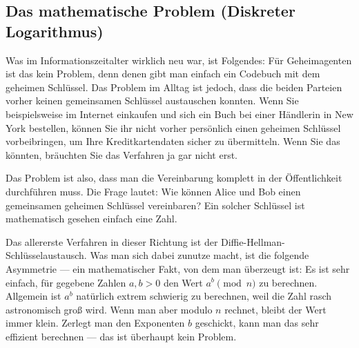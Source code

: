 \begin{math-stroke}
\begin{center}
\end{center}
\end{math-stroke}

\subsection{Das mathematische Problem (Diskreter Logarithmus)}

\begin{spoken-clean}[00:15:10 - 00:18:21]
Was im Informationszeitalter wirklich neu war, ist Folgendes: Für Geheimagenten ist das kein Problem, denn denen gibt man einfach ein Codebuch mit dem geheimen Schlüssel. Das Problem im Alltag ist jedoch, dass die beiden Parteien vorher keinen gemeinsamen Schlüssel austauschen konnten. Wenn Sie beispielsweise im Internet einkaufen und sich ein Buch bei einer Händlerin in New York bestellen, können Sie ihr nicht vorher persönlich einen geheimen Schlüssel vorbeibringen, um Ihre Kreditkartendaten sicher zu übermitteln. Wenn Sie das könnten, bräuchten Sie das Verfahren ja gar nicht erst.

Das Problem ist also, dass man die Vereinbarung komplett in der Öffentlichkeit durchführen muss. Die Frage lautet: Wie können Alice und Bob einen gemeinsamen geheimen Schlüssel vereinbaren? Ein solcher Schlüssel ist mathematisch gesehen einfach eine Zahl.

Das allererste Verfahren in dieser Richtung ist der Diffie-Hellman-\hspace{0pt}Schlüsselaustausch. Was man sich dabei zunutze macht, ist die folgende Asymmetrie --- ein mathematischer Fakt, von dem man überzeugt ist: Es ist sehr einfach, für gegebene Zahlen $a, b > 0$ den Wert $a^b \pmod n$ zu berechnen. Allgemein ist $a^b$ natürlich extrem schwierig zu berechnen, weil die Zahl rasch astronomisch groß wird. Wenn man aber modulo $n$ rechnet, bleibt der Wert immer klein. Zerlegt man den Exponenten $b$ geschickt, kann man das sehr effizient berechnen --- das ist überhaupt kein Problem.
\end{spoken-clean}

